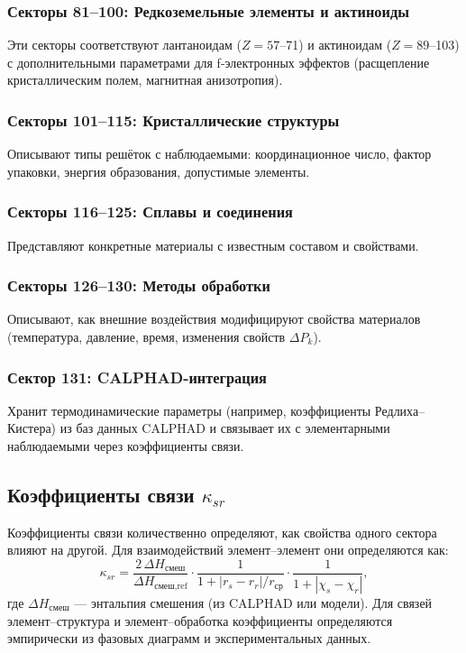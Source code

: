 \documentclass[12pt,a4paper]{article}
\begin{document}
	\subsubsection{Секторы 81–100: Редкоземельные элементы и актиноиды}
	Эти секторы соответствуют лантаноидам (\(Z=57\)–71) и актиноидам (\(Z=89\)–103) с дополнительными параметрами для f-электронных эффектов (расщепление кристаллическим полем, магнитная анизотропия).
	
	\subsubsection{Секторы 101–115: Кристаллические структуры}
	Описывают типы решёток с наблюдаемыми: координационное число, фактор упаковки, энергия образования, допустимые элементы.
	
	\subsubsection{Секторы 116–125: Сплавы и соединения}
	Представляют конкретные материалы с известным составом и свойствами.
	
	\subsubsection{Секторы 126–130: Методы обработки}
	Описывают, как внешние воздействия модифицируют свойства материалов (температура, давление, время, изменения свойств \(\Delta P_k\)).
	
	\subsubsection{Сектор 131: CALPHAD-интеграция}
	Хранит термодинамические параметры (например, коэффициенты Редлиха–Кистера) из баз данных CALPHAD и связывает их с элементарными наблюдаемыми через коэффициенты связи.
	
	\subsection{Коэффициенты связи \(\kappa_{sr}\)}
	
	Коэффициенты связи количественно определяют, как свойства одного сектора влияют на другой. Для взаимодействий элемент–элемент они определяются как:
	\[
	\kappa_{sr} = \frac{2\,\Delta H_{\text{смеш}}}{\Delta H_{\text{смеш,ref}}} \cdot
	\frac{1}{1 + |r_s - r_r|/r_{\text{ср}}} \cdot
	\frac{1}{1 + |\chi_s - \chi_r|},
	\]
	где \(\Delta H_{\text{смеш}}\) — энтальпия смешения (из CALPHAD или модели). Для связей элемент–структура и элемент–обработка коэффициенты определяются эмпирически из фазовых диаграмм и экспериментальных данных.
	
\end{document}
